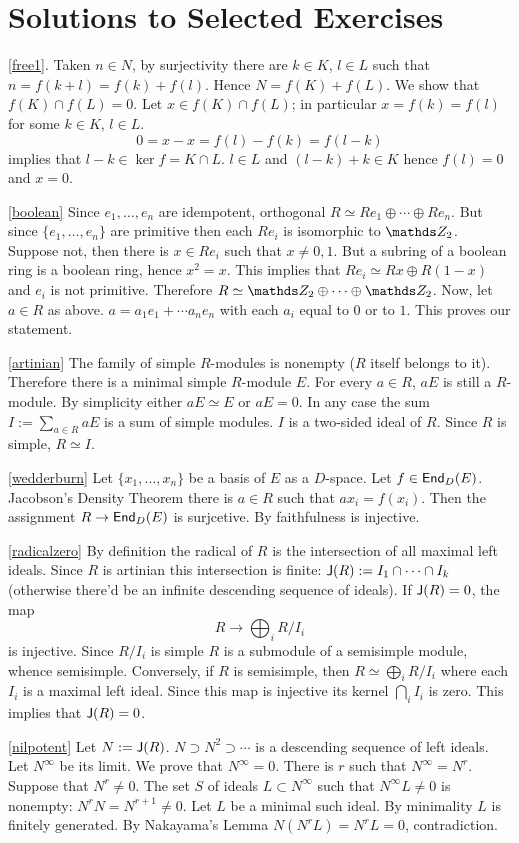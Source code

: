 \section{Solutions to Selected Exercises} 
\ref{free1}. Taken $n \in N$, by surjectivity there are $k \in K$, $l \in L$ such that $n = f(k+l)=f(k)+f(l)$. Hence $N=f(K) + f(L)$. We show that $f(K) \cap f(L)= 0$. Let $x \in f(K) \cap f(L)$; in particular $x=f(k)=f(l)$ for some $k \in K$, $l \in L$. 
$$0=x-x=f(l)-f(k)=f(l-k)$$ 
implies that $l-k \in \ker f=K \cap L$. 
$l \in L$ and $(l-k)+k \in K$ hence $f(l)=0$ and $x=0$.

\ref{boolean} Since $e_1, \ldots, e_n$ are idempotent, orthogonal $R \simeq Re_1 \oplus \cdots \oplus Re_n$. 
But since $\{e_1, \ldots, e_n\}$ are primitive then each $Re_i$ is isomorphic to $\ZZ_2$. 
Suppose not, then there is $x \in Re_i$ such that $x \neq 0,1$. 
But a subring of a boolean ring is a boolean ring, hence $x^2 =x$. 
This implies that $Re_i \simeq Rx \oplus R(1-x)$ and $e_i$ is not primitive. 
Therefore $R \simeq \ZZ_2 \oplus \cdots \oplus \ZZ_2$. 
Now, let $a \in R$ as above. 
$a=a_1 e_1 + \cdots a_n e_n$ with each $a_i$ equal to $0$ or to $1$. 
This proves our statement.

\ref{artinian} The family of simple $R$-modules is nonempty ($R$ itself belongs to it).
Therefore there is a minimal simple $R$-module $E$. 
For every $a \in R$,  $aE$ is still a $R$-module. 
By simplicity either $aE \simeq E$ or $aE=0$. 
In any case the sum $I:=\sum_{a \in R} aE$ is a sum of simple modules. 
$I$ is a two-sided ideal of $R$.
Since $R$ is simple, $R\simeq I$. 

\ref{wedderburn} Let $\{x_1, \ldots, x_n\}$ be a basis of $E$ as a $D$-space. Let $f \in \operatorname{\sf{End}}_D(E)$. 
Jacobson's Density Theorem there is $a \in R$ such that $ax_i=f(x_i)$. 
Then the assignment $R \to \operatorname{\sf{End}}_D(E)$ is surjcetive. 
By faithfulness is injective. 

\ref{radicalzero} By definition the radical of $R$ is the intersection of all maximal left ideals. 
Since $R$ is artinian this intersection is finite: $\operatorname{\sf{J}}(R):= I_1 \cap \cdots \cap I_k$ (otherwise there'd be an infinite descending sequence of ideals). 
If $\operatorname{\sf{J}}(R)=0$, the map 
$$R \to \bigoplus_i R/I_i$$ 
is injective. 
Since $R/I_i$ is simple $R$ is a submodule of a semisimple module, whence semisimple. 
Conversely, if $R$ is semisimple, then $R\simeq \bigoplus_i R/I_i$ where each $I_i$ is a maximal left ideal. 
Since this map is injective its kernel $\bigcap_i I_i$ is zero. 
This implies that $\operatorname{\sf{J}}(R)=0$.

\ref{nilpotent} Let $N:=\operatorname{\sf{J}}(R)$. 
$N \supset N^2 \supset \cdots$ is a descending sequence of left ideals. 
Let $N^{\infty}$ be its limit. 
We prove that  $N^{\infty}= 0$.  
There is $r$ such that $N^{\infty}=N^r$. 
Suppose that $N^r \neq 0$. 
The set $S$ of ideals $L \subset N^{\infty}$ such that $N^{\infty}L \neq 0$ is nonempty: $N^r N = N^{r+1} \neq 0$. 
Let $L$ be a minimal such ideal. 
By minimality $L$ is finitely generated. 
By Nakayama's Lemma $N(N^rL)=N^rL=0$, contradiction. 
